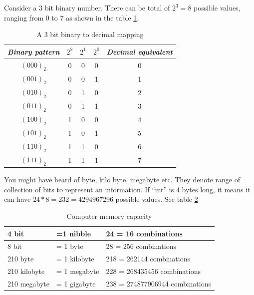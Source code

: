 \par Consider a 3 bit binary number. There can be total of $2^3 = 8$ possible values, ranging from 0 to 7 as shown in the table \ref{tab:binary}.

\begin{table}
    \centering
     \renewcommand{\arraystretch}{1.5}
    \begin{tabular}{|c|c|c|c|c|}
    \hline
        \textbf{\textit{Binary pattern}} & \textbf{\textit{$2^2$}} & \textbf{\textit{$2^1$}} & \textbf{\textit{$2^0$}} & \textbf{\textit{Decimal equivalent }}\\ \hline
        $(000)_2$ & 0 & 0 & 0 & 0 \\ \hline
        $(001)_2$ & 0 & 0 & 1 & 1 \\ \hline
        $(010)_2$ & 0 & 1 & 0 & 2 \\ \hline
        $(011)_2$ & 0 & 1 & 1 & 3 \\ \hline
        $(100)_2$ & 1 & 0 & 0 & 4 \\ \hline
        $(101)_2$ & 1 & 0 & 1 & 5 \\ \hline
        $(110)_2$ & 1 & 1 & 0 & 6 \\ \hline
        $(111)_2$ & 1 & 1 & 1 & 7 \\ \hline
    \end{tabular}
    \caption[Binary system]{A 3 bit binary to decimal mapping}
    \label{tab:binary}
\end{table}

\vspace{5mm}
\par You might have heard of byte, kilo byte, megabyte etc. They denote range of collection of bits to represent an information. If “int” is 4 bytes long, it means it can have $24*8 = 232 = 4294967296$ possible values. See table \ref{fig:memory_size}

\begin{table}
    \centering
    \renewcommand{\arraystretch}{1.5}
    \begin{tabular}{|l|l|l|}
    \hline
        4 bit &  =1 nibble & 24 = 16                                     combinations \\ \hline
        8 bit & = 1 byte & 28 = 256                                   combinations \\ \hline
        210 byte & = 1 kilobyte & 218 = 262144                           combinations \\ \hline
        210 kilobyte & = 1 megabyte & 228 = 268435456                     combinations \\ \hline
        210 megabyte & = 1 gigabyte & 238 = 274877906944               combinations \\ \hline
    \end{tabular}
    \caption[Memory size]{Computer memory capacity}
    \label{fig:memory_size}
\end{table}

